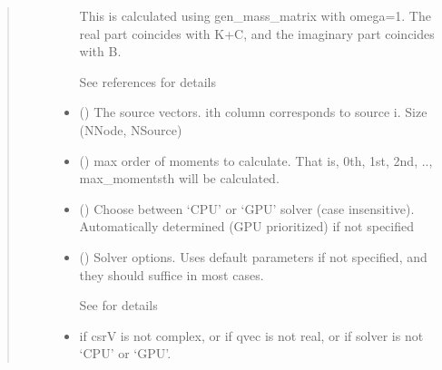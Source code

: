 \documentclass[letterpaper,10pt,english]{sphinxmanual}
\begin{document}
\begin{fulllineitems}
\begin{quote}
\begin{description}
\begin{itemize}
\sphinxAtStartPar
This is calculated using gen\_mass\_matrix with omega=1. The real part coincides with K+C, and the imaginary part coincides with \sphinxhyphen{}B.

\sphinxAtStartPar
See references for details


\item {} 
\sphinxAtStartPar
{} () \textendash{} The source vectors. i\sphinxhyphen{}th column corresponds to source i. Size (NNode, NSource)

\item {} 
\sphinxAtStartPar
{} () \textendash{} max order of moments to calculate. That is, 0th, 1st, 2nd, .., max\_moments\sphinxhyphen{}th will be calculated.

\item {} 
\sphinxAtStartPar
{} (\sphinxstyleliteralemphasis{\sphinxupquote{, }}) \textendash{} Choose between ‘CPU’ or ‘GPU’ solver (case insensitive). Automatically determined (GPU prioritized) if not specified

\item {} 
\sphinxAtStartPar
{} ({\hyperref[\detokenize{_autosummary/nirfasterff.utils.SolverOptions:nirfasterff.utils.SolverOptions}]{}}\sphinxstyleliteralemphasis{\sphinxupquote{, }}) \textendash{} 
\sphinxAtStartPar
Solver options. Uses default parameters if not specified, and they should suffice in most cases.

\sphinxAtStartPar
See {\hyperref[\detokenize{_autosummary/nirfasterff.utils.SolverOptions:nirfasterff.utils.SolverOptions}]{}} for details


\end{itemize}

\begin{itemize}
\item {} 
\sphinxAtStartPar
{} \textendash{} if csrV is not complex, or if qvec is not real, or if solver is not ‘CPU’ or ‘GPU’.


\end{itemize}
\end{description}
\end{quote}
\end{fulllineitems}
\end{document}
